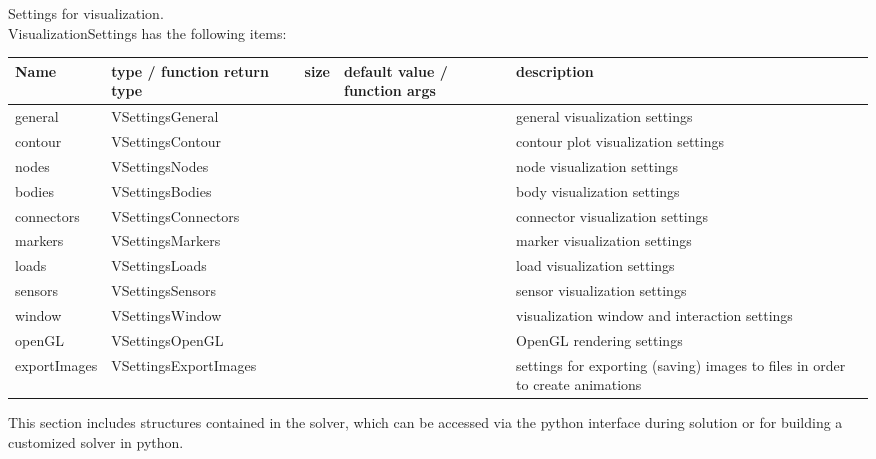  \label{sec:VisualizationSettings}
Settings for visualization. \\ 
%
VisualizationSettings has the following items:
\begin{center}
  \footnotesize
  \begin{longtable}{| p{4.2cm} | p{2.5cm} | p{0.3cm} | p{3.0cm} | p{6cm} |}
    \hline
    \bf Name & \bf type / function return type & \bf size & \bf default value / function args & \bf description \\ \hline
    general &     VSettingsGeneral &      &      &     general visualization settings\\ \hline
    contour &     VSettingsContour &      &      &     contour plot visualization settings\\ \hline
    nodes &     VSettingsNodes &      &      &     node visualization settings\\ \hline
    bodies &     VSettingsBodies &      &      &     body visualization settings\\ \hline
    connectors &     VSettingsConnectors &      &      &     connector visualization settings\\ \hline
    markers &     VSettingsMarkers &      &      &     marker visualization settings\\ \hline
    loads &     VSettingsLoads &      &      &     load visualization settings\\ \hline
    sensors &     VSettingsSensors &      &      &     sensor visualization settings\\ \hline
    window &     VSettingsWindow &      &      &     visualization window and interaction settings\\ \hline
    openGL &     VSettingsOpenGL &      &      &     OpenGL rendering settings\\ \hline
    exportImages &     VSettingsExportImages &      &      &     settings for exporting (saving) images to files in order to create animations\\ \hline
	  \end{longtable}
	\end{center}

\label{sec:solverSubstructures}
This section includes structures contained in the solver, which can be accessed via the python interface during solution or for building a customized solver in python.

